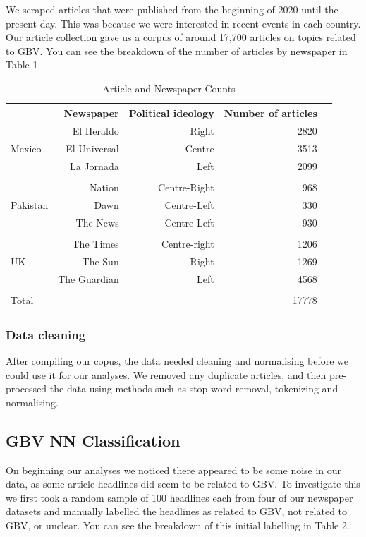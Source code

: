 \documentclass{article}
\begin{document}
{{{We scraped articles that were published from the beginning of 2020 until the present day. This was because we were interested in recent events in each country. Our article collection gave us a corpus of around 17,700 articles on topics related to GBV. You can see the breakdown of the number of articles by newspaper in Table 1.}

\begin{table}[!htp]\centering
	\caption{Article and Newspaper Counts}\label{tab: }
	\scriptsize
	\begin{tabular}{lrrrr}\toprule
		&\textbf{Newspaper} &\textbf{Political ideology} &\textbf{Number of articles} \\\midrule
		\multirow{3}{*}{Mexico} &El Heraldo &Right &2820 \\
		&El Universal &Centre &3513 \\
		&La Jornada &Left &2099 \\
		& & & \\
		\multirow{3}{*}{Pakistan} &Nation &Centre-Right &968 \\
		&Dawn &Centre-Left &330 \\
		&The News &Centre-Left &930 \\
		& & & \\
		\multirow{3}{*}{UK} &The Times &Centre-right &1206 \\
		&The Sun &Right &1269 \\
		&The Guardian &Left &4568 \\
		& & & \\
		Total & & &17778 \\
		\bottomrule
	\end{tabular}
\end{table}

\subsubsection{Data cleaning}{
After compiling our copus, the data needed cleaning and normalising before we could use it for our analyses. We removed any duplicate articles, and then pre-processed the data using methods such as stop-word removal, tokenizing and normalising.}

}

\subsection{GBV NN Classification}{
On beginning our analyses we noticed there appeared to be some noise in our data, as some article headlines did seem to be related to GBV. To investigate this we first took a random sample of 100 headlines each from four of our newspaper datasets and manually labelled the headlines as related to GBV, not related to GBV, or unclear. You can see the breakdown of this initial labelling in Table 2.

}}
\end{document}

